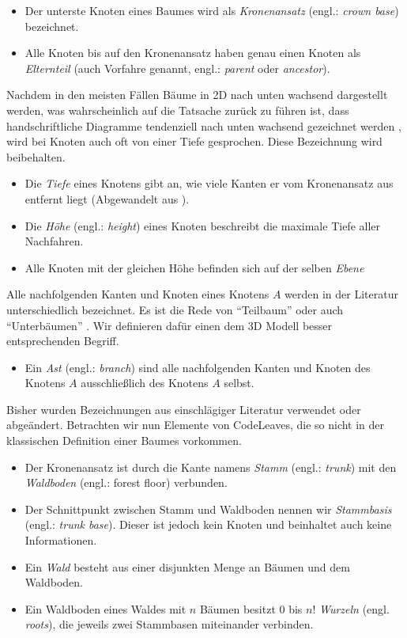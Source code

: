 \begin{itemize}
  \item Der unterste Knoten eines Baumes wird als \textit{Kronenansatz} (engl.: \textit{crown base}) bezeichnet.
  \item Alle Knoten bis auf den Kronenansatz haben genau einen Knoten als \textit{Elternteil} (auch Vorfahre genannt, engl.: \textit{parent} oder \textit{ancestor}).
\end{itemize}

Nachdem in den meisten Fällen Bäume in 2D nach unten wachsend dargestellt werden, was wahrscheinlich auf die Tatsache zurück zu führen ist, dass handschriftliche Diagramme tendenziell nach unten wachsend gezeichnet werden \cite{knuth1973fundamental}, wird bei Knoten auch oft von einer Tiefe gesprochen. Diese Bezeichnung wird beibehalten.

\begin{itemize}
  \item Die \textit{Tiefe} eines Knotens gibt an, wie viele Kanten er vom Kronenansatz aus entfernt liegt (Abgewandelt aus \cite{ernst2016grundkurs}).
  \item Die \textit{Höhe} (engl.: \textit{height}) eines Knoten beschreibt die maximale Tiefe aller Nachfahren.
  \item Alle Knoten mit der gleichen Höhe befinden sich auf der selben \textit{Ebene}
\end{itemize}

Alle nachfolgenden Kanten und Knoten eines Knotens $A$ werden in der Literatur unterschiedlich bezeichnet. Es ist die Rede von "`Teilbaum"' \cite{ernst2016grundkurs} oder auch "`Unterbäumen"' \cite{gumm2009einfuehrung}. Wir definieren dafür einen dem 3D Modell besser entsprechenden Begriff.

\begin{itemize}
  \item Ein \textit{Ast} (engl.: \textit{branch}) sind alle nachfolgenden Kanten und Knoten des Knotens $A$ ausschließlich des Knotens $A$ selbst.
\end{itemize}

Bisher wurden Bezeichnungen aus einschlägiger Literatur verwendet oder abgeändert. Betrachten wir nun Elemente von CodeLeaves, die so nicht in der klassischen Definition einer Baumes vorkommen.

\begin{itemize}
  \item Der Kronenansatz ist durch die Kante namens \textit{Stamm} (engl.: \textit{trunk}) mit den \textit{Waldboden} (engl.: forest floor) verbunden.
  \item Der Schnittpunkt zwischen Stamm und Waldboden nennen wir \textit{Stammbasis} (engl.: \textit{trunk base}). Dieser ist jedoch kein Knoten und beinhaltet auch keine Informationen.
  \item Ein \textit{Wald} besteht aus einer disjunkten Menge an Bäumen und dem Waldboden.
  \item Ein Waldboden eines Waldes mit $n$ Bäumen besitzt $0$ bis $n!$ \textit{Wurzeln} (engl. \textit{roots}), die jeweils zwei Stammbasen miteinander verbinden.
\end{itemize}

